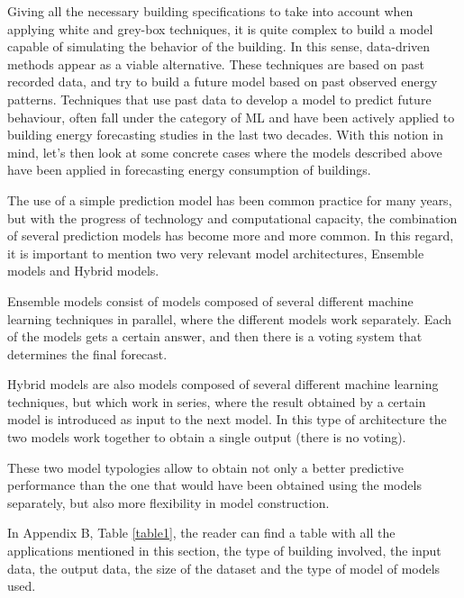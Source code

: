 Giving all the necessary building specifications to take into account when applying white and grey-box techniques, it is quite complex to build a model capable of simulating the behavior of the building. In this sense, data-driven methods appear as a viable alternative. These techniques are based on past recorded data, and try to build a future model based on past observed energy patterns. Techniques that use past data to develop a model to predict future behaviour, often fall under the category of \ac{ML} and have been actively applied to building energy forecasting studies in the last two decades. With this notion in mind, let's then look at some concrete cases where the models described above have been applied in forecasting energy consumption of buildings.

The use of a simple prediction model has been common practice for many years, but with the progress of technology and computational capacity, the combination of several prediction models has become more and more common. In this regard, it is important to mention two very relevant model architectures, Ensemble models and Hybrid models. 

Ensemble models consist of models composed of several different machine learning techniques in parallel, where the different models work separately. Each of the models gets a certain answer, and then there is a voting system that determines the final forecast. 

Hybrid models are also models composed of several different machine learning techniques, but which work in series, where the result obtained by a certain model is introduced as input to the next model. In this type of architecture the two models work together to obtain a single output (there is no voting).

These two model typologies allow to obtain not only a better predictive performance than the one that would have been obtained using the models separately, but also more flexibility in model construction.

In Appendix B, Table \ref{table1}, the reader can find a table with all the applications mentioned in this section, the type of building involved, the input data, the output data, the size of the dataset and the type of model of models used.


